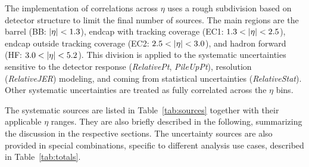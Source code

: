 \documentclass[11pt,twoside,a4paper,cmspaper,final,collab]{cms-tdr}
\begin{document}
The implementation of correlations across $\eta$ uses a rough subdivision based on detector structure to limit the final number of sources. The main regions are the barrel (BB: $\lvert \eta \rvert<1.3$), endcap with tracking coverage (EC1: $1.3<\lvert \eta \rvert<2.5$), endcap outside tracking coverage (EC2: $2.5<\lvert \eta \rvert<3.0$), and hadron forward (HF: $3.0<\lvert \eta \rvert<5.2$). This division is applied to the systematic uncertainties sensitive to the detector response (\textit{RelativePt}, \textit{PileUpPt}), resolution (\textit{RelativeJER}) modeling, and coming from statistical uncertainties (\textit{RelativeStat}). Other systematic uncertainties are treated as fully correlated across the $\eta$ bins.

The systematic sources are listed in Table~\ref{tab:sources} together with their applicable $\eta$ ranges. They are also briefly described in the following, summarizing the discussion in the respective sections. The uncertainty sources are also provided in special combinations, specific to different analysis use cases, described in Table~\ref{tab:totals}.
\end{document}
